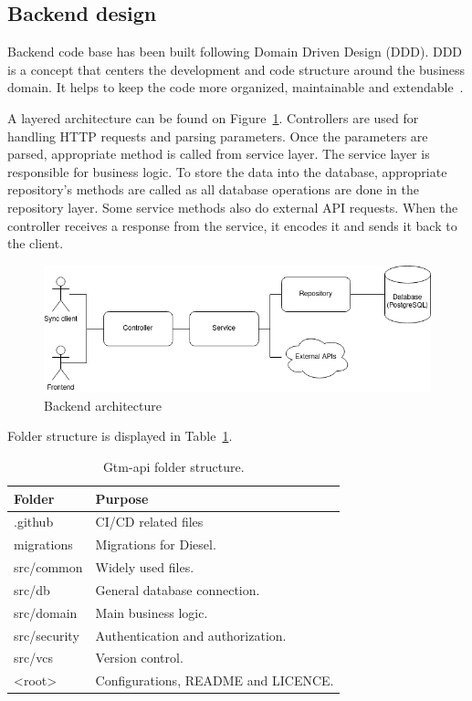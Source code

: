 \subsection{Backend design}\label{subsec:backend-design}
Backend code base has been built following Domain Driven Design (DDD).
DDD is a concept that centers the development and code structure around the business domain.
It helps to keep the code more organized, maintainable and extendable~\cite{domain-driven-design}.

A layered architecture can be found on Figure~\ref{fig:backend-layered-diagram}.
Controllers are used for handling HTTP requests and parsing parameters.
Once the parameters are parsed, appropriate method is called from service layer.
The service layer is responsible for business logic.
To store the data into the database, appropriate repository's methods are called as all database operations are done in
the repository layer.
Some service methods also do external API requests.
When the controller receives a response from the service, it encodes it and sends it back to the client.

\begin{figure}[H]
    \includegraphics[width=\textwidth]{figures/backend_layered_diagram}
    \caption{Backend architecture}
    \label{fig:backend-layered-diagram}
\end{figure}

Folder structure is displayed in Table~\ref{tab:gtm-api-folder-structure}.
\begin{table}[h]
    \centering
    \begin{tabular}{ | p{3cm} | p{10cm} |}
        \hline
        \textbf{Folder} & \textbf{Purpose}\\
        \hline
        .github & CI/CD related files\\
        \hline
        migrations & Migrations for Diesel. \\
        \hline
        src/common & Widely used files.\\
        \hline
        src/db & General database connection.\\
        \hline
        src/domain & Main business logic.\\
        \hline
        src/security & Authentication and authorization.\\
        \hline
        src/vcs & Version control.\\
        \hline
        <root> & Configurations, README and LICENCE.\\
        \hline
    \end{tabular}
    \caption{Gtm-api folder structure.}
    \label{tab:gtm-api-folder-structure}
\end{table}

